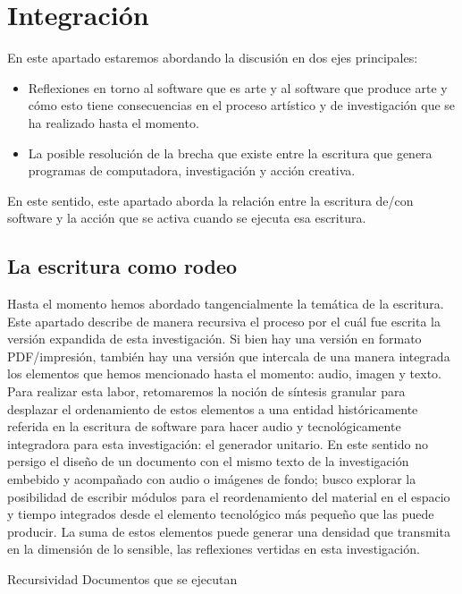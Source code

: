\chapter{Integración} 

En este apartado estaremos abordando la discusión en dos ejes principales:

\begin{itemize}
\item Reflexiones en torno al software que es arte y al software que produce arte y cómo esto tiene consecuencias en el proceso artístico y de investigación que se ha realizado hasta el momento. 
\item La posible resolución de la brecha que existe entre la escritura que genera programas de computadora, investigación y acción creativa. 
\end{itemize}

En este sentido, este apartado aborda la relación entre la escritura de/con software y la acción que se activa cuando se ejecuta esa escritura. 

\section{La escritura como rodeo}

Hasta el momento hemos abordado tangencialmente la temática de la escritura. Este apartado describe de manera recursiva el proceso por el cuál fue escrita la versión expandida de esta investigación. Si bien hay una versión en formato PDF/impresión, también hay una versión que intercala de una manera integrada los elementos que hemos mencionado hasta el momento: audio, imagen y texto. Para realizar esta labor, retomaremos la noción de síntesis granular para desplazar el ordenamiento de estos elementos a una entidad históricamente referida en la escritura de software para hacer audio y tecnológicamente integradora para esta investigación: el generador unitario. En este sentido no persigo el diseño de un documento con el mismo texto de la investigación embebido y acompañado con audio o imágenes de fondo; busco explorar la posibilidad de escribir módulos para el reordenamiento del material en el espacio y tiempo integrados desde el elemento tecnológico más pequeño que las puede producir. La suma de estos elementos puede generar una densidad que transmita en la dimensión de lo sensible, las reflexiones vertidas en esta investigación. 

Recursividad
Documentos que se ejecutan 


